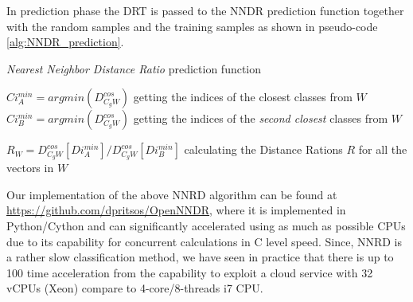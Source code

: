 In prediction phase the DRT is passed to the NNDR prediction function together with the random samples and the training samples as shown in pseudo-code \ref{alg:NNDR_prediction}.

\begin{algorithm}[H]
\caption{\textit{Nearest Neighbor Distance Ratio} prediction function}\label{alg:NNDR_prediction}


$Ci^{min}_{A} = argmin(D^{cos}_{C_{g}W})$ getting the indices of the closest classes from $W$\;
$Ci^{min}_{B} = argmin(D^{cos}_{C_{g}W})$ getting the indices of the \textit{second closest} classes from $W$\;

$R_{W} = D^{cos}_{C_{g}W}[Di^{min}_{A}] / D^{cos}_{C_{g}W}[Di^{min}_{B}]$ calculating the Distance Rations $R$ for all the vectors in $W$


\end{algorithm}

Our implementation of the above NNRD algorithm can be found at \url{https://github.com/dpritsos/OpenNNDR}, where it is implemented in Python/Cython and can significantly accelerated using as much as possible CPUs due to its capability for concurrent calculations in C level speed. Since, NNRD is a rather slow classification method, we have seen in practice that there is up to 100 time acceleration from the capability to exploit a cloud service with 32 vCPUs (Xeon) compare to 4-core/8-threads i7 CPU.
